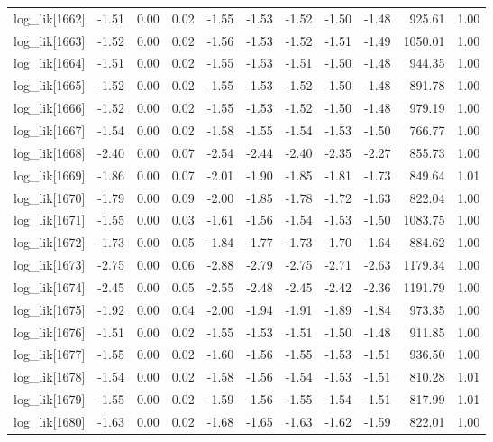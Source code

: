 \begin{table}[ht]
\begin{tabular}{rrrrrrrrrrr}
  log\_lik[1662] & -1.51 & 0.00 & 0.02 & -1.55 & -1.53 & -1.52 & -1.50 & -1.48 & 925.61 & 1.00 \\ 
  log\_lik[1663] & -1.52 & 0.00 & 0.02 & -1.56 & -1.53 & -1.52 & -1.51 & -1.49 & 1050.01 & 1.00 \\ 
  log\_lik[1664] & -1.51 & 0.00 & 0.02 & -1.55 & -1.53 & -1.51 & -1.50 & -1.48 & 944.35 & 1.00 \\ 
  log\_lik[1665] & -1.52 & 0.00 & 0.02 & -1.55 & -1.53 & -1.52 & -1.50 & -1.48 & 891.78 & 1.00 \\ 
  log\_lik[1666] & -1.52 & 0.00 & 0.02 & -1.55 & -1.53 & -1.52 & -1.50 & -1.48 & 979.19 & 1.00 \\ 
  log\_lik[1667] & -1.54 & 0.00 & 0.02 & -1.58 & -1.55 & -1.54 & -1.53 & -1.50 & 766.77 & 1.00 \\ 
  log\_lik[1668] & -2.40 & 0.00 & 0.07 & -2.54 & -2.44 & -2.40 & -2.35 & -2.27 & 855.73 & 1.00 \\ 
  log\_lik[1669] & -1.86 & 0.00 & 0.07 & -2.01 & -1.90 & -1.85 & -1.81 & -1.73 & 849.64 & 1.01 \\ 
  log\_lik[1670] & -1.79 & 0.00 & 0.09 & -2.00 & -1.85 & -1.78 & -1.72 & -1.63 & 822.04 & 1.00 \\ 
  log\_lik[1671] & -1.55 & 0.00 & 0.03 & -1.61 & -1.56 & -1.54 & -1.53 & -1.50 & 1083.75 & 1.00 \\ 
  log\_lik[1672] & -1.73 & 0.00 & 0.05 & -1.84 & -1.77 & -1.73 & -1.70 & -1.64 & 884.62 & 1.00 \\ 
  log\_lik[1673] & -2.75 & 0.00 & 0.06 & -2.88 & -2.79 & -2.75 & -2.71 & -2.63 & 1179.34 & 1.00 \\ 
  log\_lik[1674] & -2.45 & 0.00 & 0.05 & -2.55 & -2.48 & -2.45 & -2.42 & -2.36 & 1191.79 & 1.00 \\ 
  log\_lik[1675] & -1.92 & 0.00 & 0.04 & -2.00 & -1.94 & -1.91 & -1.89 & -1.84 & 973.35 & 1.00 \\ 
  log\_lik[1676] & -1.51 & 0.00 & 0.02 & -1.55 & -1.53 & -1.51 & -1.50 & -1.48 & 911.85 & 1.00 \\ 
  log\_lik[1677] & -1.55 & 0.00 & 0.02 & -1.60 & -1.56 & -1.55 & -1.53 & -1.51 & 936.50 & 1.00 \\ 
  log\_lik[1678] & -1.54 & 0.00 & 0.02 & -1.58 & -1.56 & -1.54 & -1.53 & -1.51 & 810.28 & 1.01 \\ 
  log\_lik[1679] & -1.55 & 0.00 & 0.02 & -1.59 & -1.56 & -1.55 & -1.54 & -1.51 & 817.99 & 1.01 \\ 
  log\_lik[1680] & -1.63 & 0.00 & 0.02 & -1.68 & -1.65 & -1.63 & -1.62 & -1.59 & 822.01 & 1.00 \\ 

\end{tabular}
\end{table}
